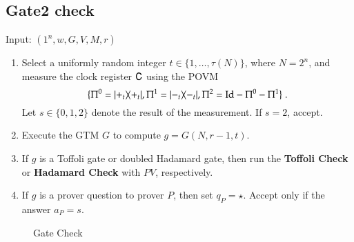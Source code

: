 \subsection{Gate2 check}
\label{sec:prop_check}


\vspace{10pt}
\begin{center}
\begin{mdframed}
    Input: $(1^n,w,G,V,M,r)$
	\begin{enumerate}
		\item Select a uniformly random integer $t\in\{1,\ldots, \tau(N)\}$, where $N = 2^n$, and measure the clock register ${\mathsf{C}}$ using the POVM 
\[
	\{ 	\Pi^0 = |+_t\rangle\! \langle +_t|, 
	\Pi^1 = |-_t\rangle\! \langle -_t|, 
	\Pi^2 = \mathop{\mathrm{Id}}\!\mathinner{} - \Pi^0 - \Pi^1 \}\;.
\]	
Let $s \in \{0,1,2\}$ denote the result of the measurement. If $s = 2$, accept.

	\item Execute the GTM $G$ to compute $g = G(N,r-1,t)$. 
	\item If $g$ is a Toffoli gate or doubled Hadamard gate, then run the \textbf{Toffoli Check} or \textbf{Hadamard Check} with $PV$, respectively. 
	\item If $g$ is a prover question to prover $P$, then set $q_P = \star$. Accept only if the answer $a_P = s$.
%	
%	
	\end{enumerate}    
\end{mdframed}

\end{center}
\begin{figure}[H]
\caption{Gate Check}
\label{fig:prop_check}
\end{figure}

